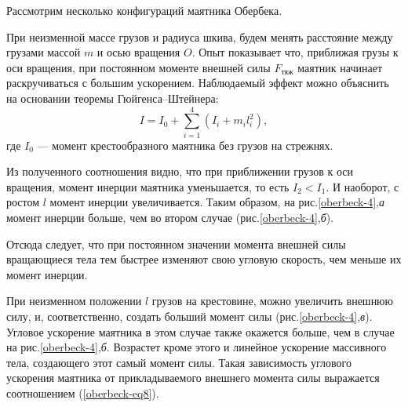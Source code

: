 \documentclass[14pt,a4paper,oneside]{extarticle}	%
\begin{document}
   Рассмотрим несколько конфигураций маятника Обербека.
            
  При неизменной массе грузов и радиуса шкива, будем менять расстояние между грузами массой $ m $ и осью вращения $ O $.
    Опыт показывает что, приближая грузы к оси вращения, при постоянном моменте внешней силы $ F_{\text{тяж}} $ маятник начинает раскручиваться с большим ускорением.
    Наблюдаемый эффект можно объяснить на основании теоремы Гюйгенса–Штейнера: 
    \begin{equation}\label{oberbeck-eq9}
    I = I_{0} + \sum_{i = 1}^{4}(I_{i}+m_{i}l_{i}^{2}),
    \end{equation}
    где $ I_{0} $ — момент крестообразного маятника без грузов на стрежнях.
    
    Из полученного соотношения видно, что при приближении грузов к оси вращения, момент инерции маятника уменьшается, то есть $ I_2<I_1 $.
    И наоборот, с ростом $ l $ момент инерции увеличивается.
    Таким образом, на рис.\ref{oberbeck-4},\textit{а} момент инерции больше, чем во втором случае (рис.\ref{oberbeck-4},\textit{б}).
    
    Отсюда следует, что при постоянном значении момента внешней силы вращающиеся тела тем быстрее изменяют свою угловую скорость, чем меньше их момент инерции.
		
 При неизменном положении $ l $ грузов на крестовине, можно увеличить внешнюю силу, и, соответственно, создать больший момент силы (рис.\ref{oberbeck-4},\textit{в}). 
	Угловое ускорение маятника в этом случае также окажется больше, чем в случае на рис.\ref{oberbeck-4},\textit{б}.
	Возрастет кроме этого и линейное ускорение массивного тела, создающего этот самый момент силы.
	Такая зависимость углового ускорения маятника от прикладываемого внешнего момента силы выражается соотношением (\ref{oberbeck-eq8}).  
\end{document}
